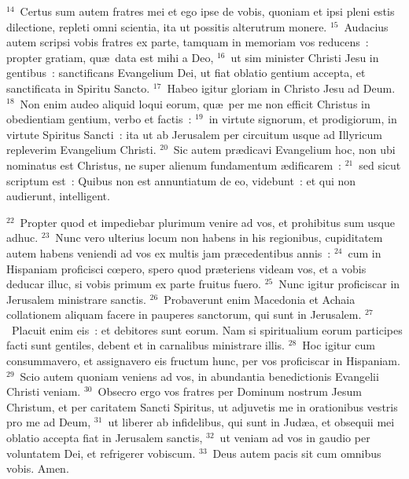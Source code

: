 ${}^{14}$~Certus sum autem fratres mei et ego ipse de vobis, quoniam et ipsi pleni estis dilectione, repleti omni scientia, ita ut possitis alterutrum monere.
${}^{15}$~Audacius autem scripsi vobis fratres ex parte, tamquam in memoriam vos reducens~: propter gratiam, qu\ae\ data est mihi a Deo,
${}^{16}$~ut sim minister Christi Jesu in gentibus~: sanctificans Evangelium Dei, ut fiat oblatio gentium accepta, et sanctificata in Spiritu Sancto.
${}^{17}$~Habeo igitur gloriam in Christo Jesu ad Deum.
${}^{18}$~Non enim audeo aliquid loqui eorum, qu\ae\ per me non efficit Christus in obedientiam gentium, verbo et factis~:
${}^{19}$~in virtute signorum, et prodigiorum, in virtute Spiritus Sancti~: ita ut ab Jerusalem per circuitum usque ad Illyricum repleverim Evangelium Christi.
${}^{20}$~Sic autem pr\ae dicavi Evangelium hoc, non ubi nominatus est Christus, ne super alienum fundamentum \ae dificarem~:
${}^{21}$~sed sicut scriptum est~: Quibus non est annuntiatum de eo, videbunt~: et qui non audierunt, intelligent.


${}^{22}$~Propter quod et impediebar plurimum venire ad vos, et prohibitus sum usque adhuc.
${}^{23}$~Nunc vero ulterius locum non habens in his regionibus, cupiditatem autem habens veniendi ad vos ex multis jam pr\ae cedentibus annis~:
${}^{24}$~cum in Hispaniam proficisci cœpero, spero quod pr\ae teriens videam vos, et a vobis deducar illuc, si vobis primum ex parte fruitus fuero.
${}^{25}$~Nunc igitur proficiscar in Jerusalem ministrare sanctis.
${}^{26}$~Probaverunt enim Macedonia et Achaia collationem aliquam facere in pauperes sanctorum, qui sunt in Jerusalem.
${}^{27}$~Placuit enim eis~: et debitores sunt eorum. Nam si spiritualium eorum participes facti sunt gentiles, debent et in carnalibus ministrare illis.
${}^{28}$~Hoc igitur cum consummavero, et assignavero eis fructum hunc, per vos proficiscar in Hispaniam.
${}^{29}$~Scio autem quoniam veniens ad vos, in abundantia benedictionis Evangelii Christi veniam.
${}^{30}$~Obsecro ergo vos fratres per Dominum nostrum Jesum Christum, et per caritatem Sancti Spiritus, ut adjuvetis me in orationibus vestris pro me ad Deum,
${}^{31}$~ut liberer ab infidelibus, qui sunt in Jud\ae a, et obsequii mei oblatio accepta fiat in Jerusalem sanctis,
${}^{32}$~ut veniam ad vos in gaudio per voluntatem Dei, et refrigerer vobiscum.
${}^{33}$~Deus autem pacis sit cum omnibus vobis. Amen.

